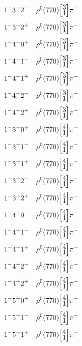 \documentclass[10pt,a4paper]{article}
\def\dst{\displaystyle}
\def\vsp{\hbox{\vrule height12.5pt depth3.5pt width0pt}}
\def\ells#1#2{\Big[\hskip-5pt\vsp\begin{array}{c}\dst#1\\[-4pt]\dst#2\end{array}\vsp\hskip-5pt\Big]}
\begin{document}
\begin{align*} 
 \begin{aligned}
1^{-}3^{-}2^{-}\quad & \rho^0(770)\ells{3}{1}\pi^-\\
1^{-}3^{-}2^{+}\quad & \rho^0(770)\ells{3}{1}\pi^-\\
1^{-}4^{-}0^{+}\quad & \rho^0(770)\ells{3}{1}\pi^-\\
1^{-}4^{-}1^{-}\quad & \rho^0(770)\ells{3}{1}\pi^-\\
1^{-}4^{-}1^{+}\quad & \rho^0(770)\ells{3}{1}\pi^-\\
1^{-}4^{-}2^{-}\quad & \rho^0(770)\ells{3}{1}\pi^-\\
1^{-}4^{-}2^{+}\quad & \rho^0(770)\ells{3}{1}\pi^-\\
1^{-}3^{+}0^{+}\quad & \rho^0(770)\ells{4}{1}\pi^-\\
1^{-}3^{+}1^{-}\quad & \rho^0(770)\ells{4}{1}\pi^-\\
1^{-}3^{+}1^{+}\quad & \rho^0(770)\ells{4}{1}\pi^-\\
1^{-}3^{+}2^{-}\quad & \rho^0(770)\ells{4}{1}\pi^-\\
1^{-}3^{+}2^{+}\quad & \rho^0(770)\ells{4}{1}\pi^-\\
1^{-}4^{+}0^{-}\quad & \rho^0(770)\ells{4}{1}\pi^-\\
1^{-}4^{+}1^{-}\quad & \rho^0(770)\ells{4}{1}\pi^-\\
1^{-}4^{+}1^{+}\quad & \rho^0(770)\ells{4}{1}\pi^-\\
1^{-}4^{+}2^{-}\quad & \rho^0(770)\ells{4}{1}\pi^-\\
1^{-}4^{+}2^{+}\quad & \rho^0(770)\ells{4}{1}\pi^-\\
1^{-}5^{+}0^{+}\quad & \rho^0(770)\ells{4}{1}\pi^-\\
1^{-}5^{+}1^{-}\quad & \rho^0(770)\ells{4}{1}\pi^-\\
1^{-}5^{+}1^{+}\quad & \rho^0(770)\ells{4}{1}\pi^-\\
\end{aligned} 
 \end{align*}\pagebreak
\end{document}

